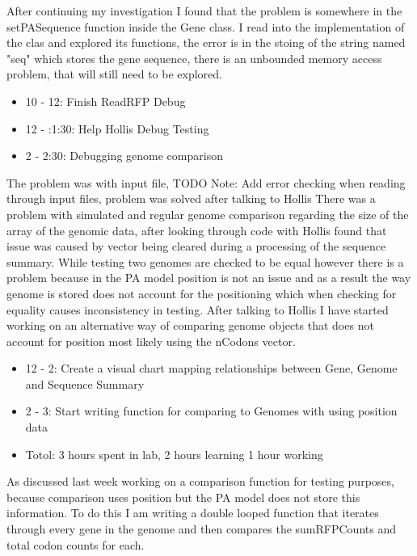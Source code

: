 \documentclass[12pt,hyperref]{labbook}
\begin{document}
After continuing my investigation I found that the problem is somewhere in the setPASequence function inside the Gene class. I read into the implementation of the clas and explored its functions, the error is in the stoing of the string named "seq" which stores the gene sequence, there is an unbounded memory access problem, that will still need to be explored. 
\begin{itemize}
    \item 10 - 12: Finish ReadRFP Debug
    \item 12 - :1:30: Help Hollis Debug Testing
    \item 2 - 2:30: Debugging genome comparison
\end{itemize}
The problem was with input file, TODO Note: Add error checking when reading through input files, problem was solved after talking to Hollis
There was a problem with simulated and regular genome comparison regarding the size of the array of the genomic data, after looking through code with Hollis found that issue was caused by vector being cleared during a processing of the sequence summary.
While testing two genomes are checked to be equal however there is a problem because in the PA model position is not an issue and as a result the way genome is stored does not account for the positioning which when checking for equality causes inconsistency in testing. After talking to Hollis I have started working on an alternative way of comparing genome objects that does not account for position most likely using the nCodons vector. 
\begin{itemize}
    \item 12 - 2: Create a visual chart mapping relationships between Gene, Genome and Sequence Summary
    \item 2 - 3: Start writing function for comparing to Genomes with using position data
    \item Totol: 3 hours spent in lab, 2 hours learning 1 hour working
\end{itemize}
As discussed last week working on a comparison function for testing purposes, because comparison uses position but the PA model does not store this information. To do this I am writing a double looped function that iterates through every gene in the genome and then compares the sumRFPCounts and total codon counts for each.
\end{document}
